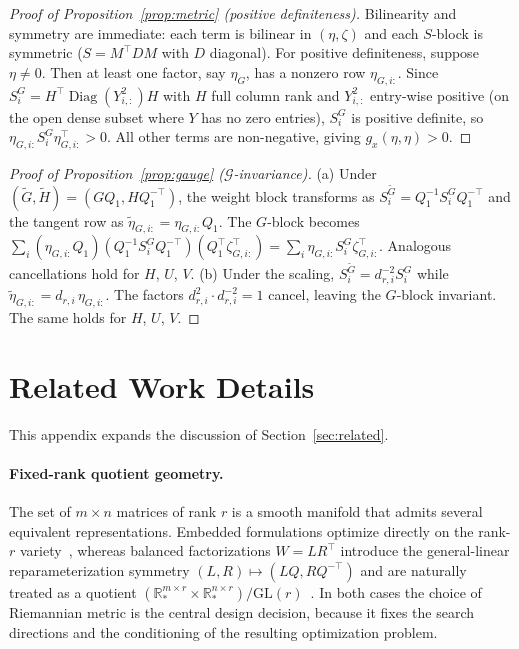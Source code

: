 \documentclass[letterpaper, 10 pt, conference]{ieeeconf}
\newcommand{\R}{\mathbb{R}}
\newcommand{\cG}{\mathcal{G}}
\newcommand{\diag}{\operatorname{Diag}}
\theoremstyle{plain}
\theoremstyle{definition}
\theoremstyle{remark}
\begin{document}
\begin{proof}[Proof of Proposition~\ref{prop:metric} (positive definiteness)]
Bilinearity and symmetry are immediate: each term is bilinear in $(\eta,\zeta)$ and each $S$-block is symmetric ($S = M^\top D M$ with $D$ diagonal).
For positive definiteness, suppose $\eta \neq 0$. Then at least one factor, say $\eta_G$, has a nonzero row $\eta_{G,i:}$.
Since $S_i^G = H^\top\diag(Y_{i,:}^2)H$ with $H$ full column rank and $Y_{i,:}^2$ entry-wise positive (on the open dense subset where $Y$ has no zero entries), $S_i^G$ is positive definite, so $\eta_{G,i:}S_i^G\eta_{G,i:}^\top > 0$.
All other terms are non-negative, giving $g_x(\eta,\eta) > 0$.
\end{proof}

\begin{proof}[Proof of Proposition~\ref{prop:gauge} ($\cG$-invariance)]
(a) Under $(\tilde G,\tilde H) = (GQ_1, HQ_1^{-\top})$, the weight block transforms as $S_i^{\tilde G} = Q_1^{-1}S_i^G Q_1^{-\top}$ and the tangent row as $\tilde\eta_{G,i:} = \eta_{G,i:}Q_1$.
The $G$-block becomes $\sum_i (\eta_{G,i:}Q_1)(Q_1^{-1}S_i^G Q_1^{-\top})(Q_1^\top\zeta_{G,i:}^\top) = \sum_i \eta_{G,i:}S_i^G\zeta_{G,i:}^\top$.
Analogous cancellations hold for $H$, $U$, $V$.
(b) Under the scaling, $S_i^{\tilde G} = d_{r,i}^{-2} S_i^G$ while $\tilde\eta_{G,i:} = d_{r,i}\,\eta_{G,i:}$.
The factors $d_{r,i}^2 \cdot d_{r,i}^{-2} = 1$ cancel, leaving the $G$-block invariant. The same holds for $H$, $U$, $V$.
\end{proof}

\section{Related Work Details}
\label{app:related}
This appendix expands the discussion of Section~\ref{sec:related}.

\paragraph{Fixed-rank quotient geometry.}
The set of $m\times n$ matrices of rank $r$ is a smooth manifold that admits several equivalent representations. Embedded formulations optimize directly on the rank-$r$ variety~\cite{vandereycken2013low}, whereas balanced factorizations $W = LR^\top$ introduce the general-linear reparameterization symmetry $(L,R)\mapsto(LQ, RQ^{-\top})$ and are naturally treated as a quotient $(\R_*^{m\times r}\times\R_*^{n\times r})/\mathrm{GL}(r)$~\cite{mishra2014r3mc,mishra2012riemannian}. In both cases the choice of Riemannian metric is the central design decision, because it fixes the search directions and the conditioning of the resulting optimization problem.
\end{document}
